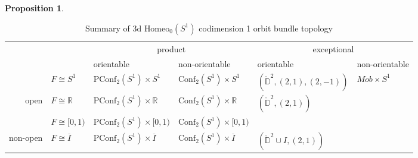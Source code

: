 \documentclass[10pt, oneside]{article}
\newcommand{\R}{\mathbb{R}}
\newcommand{\Z}{\mathbb{Z}}
\newcommand{\homeo}[1][S^1]{\text{Homeo}_0(#1)}
\newcommand{\cl}[1]{\overline{#1}}
\newcommand{\conf}[2][S^1]{\text{Conf}_{#2}(#1)}
\newcommand{\pconf}[2][S^1]{\text{PConf}_{#2}(#1)}
\theoremstyle{definition}
\newtheorem{prop}{Proposition}[section]
\theoremstyle{definition}
\begin{document}
\begin{prop}
\end{prop}
\setlength\extrarowheight{3pt}
\begin{table}[]
\begin{tabular}{rlll|ll}
\multicolumn{1}{l}{}       &                                              & \multicolumn{2}{c|}{product}                                                          & \multicolumn{2}{c}{exceptional}                                                                                 \\
\multicolumn{1}{l}{}       &                                              & \multicolumn{1}{l|}{orientable}                      & non-orientable                 & \multicolumn{1}{l|}{orientable}                                 & non-orientable                                \\ \cline{3-6} 
                           & \multicolumn{1}{l|}{$F\cong S^1$}            & \multicolumn{1}{l|}{$\pconf{2}\times S^1$}           & $\conf{2}\times S^1$           & \multicolumn{1}{l|}{$(\mathring{\mathbb{D}}^2, (2, 1), (2,-1))$} & \multicolumn{1}{l|}{$M\ddot{o}b\times S^1$}   \\ \cline{2-6} 
\multirow{-2}{*}{open}     & \multicolumn{1}{l|}{$F\cong \R$}             & \multicolumn{1}{l|}{$\pconf{2}\times \R$}            & $\conf{2}\times \R$            & \multicolumn{1}{l|}{$(\mathring{\mathbb{D}}^2, (2, 1))$}        & \multicolumn{1}{l|}{\cellcolor[HTML]{EFEFEF}} \\ \hline
                           & \multicolumn{1}{l|}{$F\cong \lbrack 0, 1 )$} & \multicolumn{1}{l|}{$\pconf{2}\times \lbrack 0, 1)$} & $\conf{2}\times \lbrack 0, 1)$ & \multicolumn{1}{l|}{\cellcolor[HTML]{EFEFEF}}                   & \multicolumn{1}{l|}{\cellcolor[HTML]{EFEFEF}} \\ \cline{2-6} 
\multirow{-2}{*}{non-open} & \multicolumn{1}{l|}{$F\cong \cl{I}$}         & \multicolumn{1}{l|}{$\pconf{2}\times \cl{I}$}        & $\conf{2}\times \cl{I}$        & \multicolumn{1}{l|}{$(\mathring{\mathbb{D}}^2\cup I, (2,1))$}   & \multicolumn{1}{l|}{\cellcolor[HTML]{EFEFEF}} \\ \cline{2-6} 
\end{tabular}
\caption{Summary of 3d $\homeo$ codimension 1 orbit bundle topology}
\label{table:orbit-bundles}
\end{table}
\end{document}
